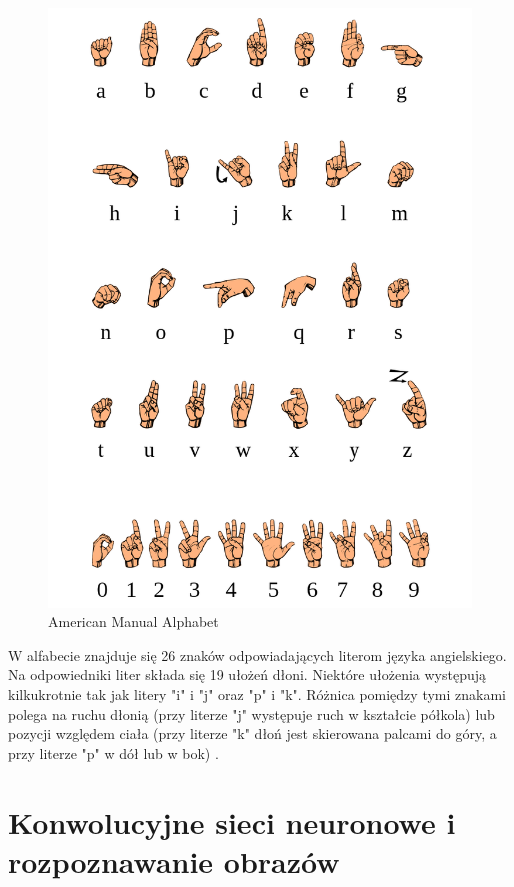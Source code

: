 \documentclass[a4paper,12pt,oneside]{book} %
\begin{document}
\begin{figure}[h]
\centering
\includegraphics[scale=0.45]{ama.png}
\caption{American Manual Alphabet \cite{wikipedia_2022}}
\end{figure}

W alfabecie znajduje się 26 znaków odpowiadających literom języka angielskiego. Na odpowiedniki liter składa się 19 ułożeń dłoni. Niektóre ułożenia występują kilkukrotnie tak jak litery "i" i "j" oraz "p" i "k". Różnica pomiędzy tymi znakami polega na ruchu dłonią (przy literze "j" występuje ruch w kształcie półkola) lub pozycji względem ciała (przy literze "k" dłoń jest skierowana palcami do góry, a przy literze "p" w dół lub w bok) \cite{costello}.


\chapter{Konwolucyjne sieci neuronowe i rozpoznawanie obrazów}
\end{document}
